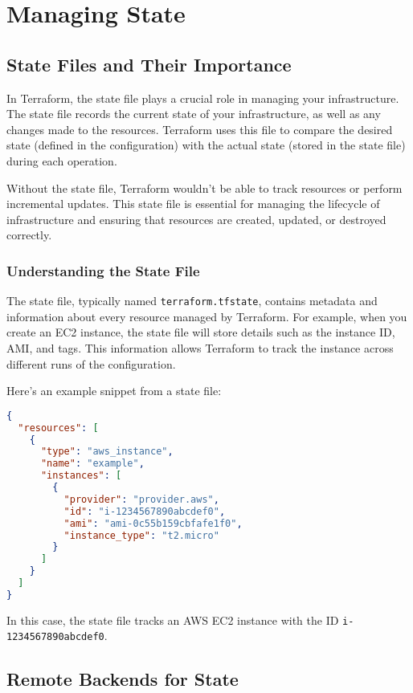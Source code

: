 \chapter{Managing State}

\sloppy

\section{State Files and Their Importance}

In Terraform, the state file plays a crucial role in managing your infrastructure. The state file records the current state of your infrastructure, as well as any changes made to the resources. Terraform uses this file to compare the desired state (defined in the configuration) with the actual state (stored in the state file) during each operation.

Without the state file, Terraform wouldn't be able to track resources or perform incremental updates. This state file is essential for managing the lifecycle of infrastructure and ensuring that resources are created, updated, or destroyed correctly.

\subsection{Understanding the State File}

The state file, typically named \texttt{terraform.tfstate}, contains metadata and information about every resource managed by Terraform. For example, when you create an EC2 instance, the state file will store details such as the instance ID, AMI, and tags. This information allows Terraform to track the instance across different runs of the configuration.

Here's an example snippet from a state file:

\begin{lstlisting}[language=json]
{
  "resources": [
    {
      "type": "aws_instance",
      "name": "example",
      "instances": [
        {
          "provider": "provider.aws",
          "id": "i-1234567890abcdef0",
          "ami": "ami-0c55b159cbfafe1f0",
          "instance_type": "t2.micro"
        }
      ]
    }
  ]
}
\end{lstlisting}

In this case, the state file tracks an AWS EC2 instance with the ID \texttt{i-1234567890abcdef0}.

\section{Remote Backends for State}

